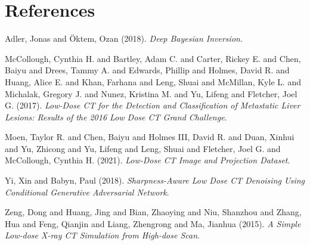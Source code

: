 \documentclass[a4paper, 11pt]{article}
\begin{document}
\section{References}
\label{sec:org48d6488}
\noindent
Adler, Jonas and Öktem, Ozan (2018). \emph{Deep {{Bayesian Inversion}}}.

\noindent
McCollough, Cynthia H. and Bartley, Adam C. and Carter, Rickey E. and Chen, Baiyu and Drees, Tammy A. and Edwards, Phillip and Holmes, David R. and Huang, Alice E. and Khan, Farhana and Leng, Shuai and McMillan, Kyle L. and Michalak, Gregory J. and Nunez, Kristina M. and Yu, Lifeng and Fletcher, Joel G. (2017). \emph{Low-Dose {{CT}} for the Detection and Classification of Metastatic Liver Lesions: {{Results}} of the 2016 {{Low Dose CT Grand Challenge}}}.

\noindent
Moen, Taylor R. and Chen, Baiyu and Holmes III, David R. and Duan, Xinhui and Yu, Zhicong and Yu, Lifeng and Leng, Shuai and Fletcher, Joel G. and McCollough, Cynthia H. (2021). \emph{Low-Dose {{CT}} Image and Projection Dataset}.

\noindent
Yi, Xin and Babyn, Paul (2018). \emph{Sharpness-Aware {{Low}} Dose {{CT}} Denoising Using Conditional Generative Adversarial Network}.

\noindent
Zeng, Dong and Huang, Jing and Bian, Zhaoying and Niu, Shanzhou and Zhang, Hua and Feng, Qianjin and Liang, Zhengrong and Ma, Jianhua (2015). \emph{A {{Simple Low-dose X-ray CT Simulation}} from {{High-dose Scan}}}.
\end{document}
